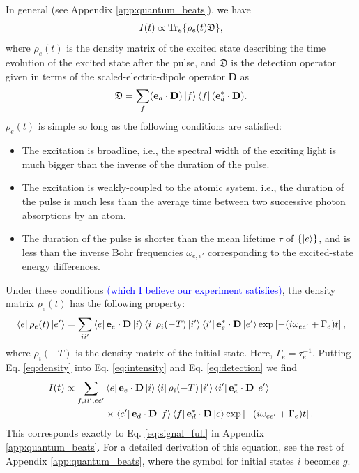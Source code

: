 \documentclass[11pt]{article}
\newcommand{\lb}{\left[}
\newcommand{\rb}{\right]}
\begin{document}
In general (see Appendix \ref{app:quantum_beats}), we have
\begin{equation}\label{eq:intensity}
I(t) \propto \Tr_e\{   \rho_e(t) \mathfrak{D}  \},
\end{equation}
where $\rho_e(t)$ is the density matrix of the excited state describing the time evolution of the excited state after the pulse, and $\mathfrak{D}$ is the detection operator given in terms of the scaled-electric-dipole operator $\mathbf{D}$ as 
\begin{equation}\label{eq:detection}
\mathfrak{D} = \sum_f (\mathbf{e}_d \cdot \mathbf{D}) \ket{f}\bra{f}(\mathbf{e}_d^* \cdot \mathbf{D}).
\end{equation}
$\rho_e(t)$ is simple so long as the following conditions are satisfied:
\begin{itemize}
	\item The excitation is broadline, i.e., the spectral width of the exciting light is much bigger than the inverse of the duration of the pulse. 
	\item The excitation is weakly-coupled to the atomic system, i.e., the duration of the pulse is much less than the average time between two successive photon absorptions by an atom. 
	\item The duration of the pulse is shorter than the mean lifetime $\tau$ of $\{ \ket{e} \}$, and is less than the inverse Bohr frequencies $\omega_{e,e'}$ corresponding to the excited-state energy differences. 
\end{itemize}
Under these conditions \textcolor{blue}{(which I believe our experiment satisfies)}, the density matrix $\rho_e(t)$ has the following property:
\begin{equation}\label{eq:density}
\bra{e} \rho_e(t) \ket{e'} = \sum_{ii'} \bra{e} \mathbf{e}_e \cdot \mathbf{D} \ket{i} \bra{i} \rho_i(-T) \ket{i'} \bra{i'} \mathbf{e}_e^* \cdot \mathbf{D} \ket{e'} \exp\lb -(i\omega_{ee'} + \Gamma_e) t \rb,
\end{equation}
where $\rho_i(-T)$ is the density matrix of the initial state. Here, $\Gamma_e = \tau_e^{-1}$. Putting Eq. \ref{eq:density} into Eq. \ref{eq:intensity} and Eq. \ref{eq:detection} we find
\begin{align}\label{eq:Intensity_full}
I(t) \propto \sum_{f,ii',ee'} &\bra{e} \mathbf{e}_e \cdot \mathbf{D} \ket{i} \bra{i} \rho_i(-T) \ket{i'} \bra{i'} \mathbf{e}_e^* \cdot \mathbf{D} \ket{e'} \nonumber \\
&\times \bra{e'}\mathbf{e}_d \cdot \mathbf{D} \ket{f}\bra{f}\mathbf{e}_d^* \cdot \mathbf{D} \ket{e} \exp\lb -(i\omega_{ee'} + \Gamma_e) t \rb.
\end{align}
This corresponds exactly to Eq. \ref{eq:signal_full} in Appendix \ref{app:quantum_beats}. For a detailed derivation of this equation, see the rest of Appendix \ref{app:quantum_beats}, where the symbol for initial states $i$ becomes $g$. 
\end{document}
